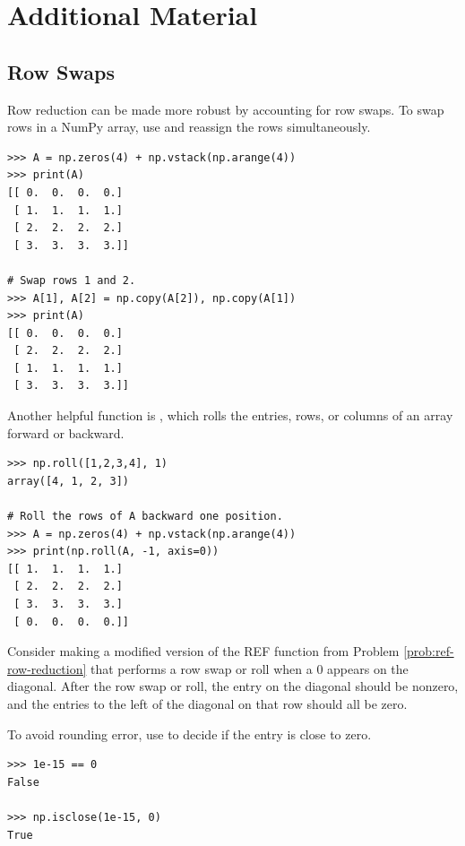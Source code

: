 \newpage

\section*{Additional Material} %

\subsection*{Row Swaps} %

Row reduction can be made more robust by accounting for row swaps.
To swap rows in a NumPy array, use  and reassign the rows simultaneously.

\begin{lstlisting}
>>> A = np.zeros(4) + np.vstack(np.arange(4))
>>> print(A)
[[ 0.  0.  0.  0.]
 [ 1.  1.  1.  1.]
 [ 2.  2.  2.  2.]
 [ 3.  3.  3.  3.]]

# Swap rows 1 and 2.
>>> A[1], A[2] = np.copy(A[2]), np.copy(A[1])
>>> print(A)
[[ 0.  0.  0.  0.]
 [ 2.  2.  2.  2.]
 [ 1.  1.  1.  1.]
 [ 3.  3.  3.  3.]]
\end{lstlisting}

Another helpful function is , which rolls the entries, rows, or columns of an array forward or backward.

\begin{lstlisting}
>>> np.roll([1,2,3,4], 1)
array([4, 1, 2, 3])

# Roll the rows of A backward one position.
>>> A = np.zeros(4) + np.vstack(np.arange(4))
>>> print(np.roll(A, -1, axis=0))
[[ 1.  1.  1.  1.]
 [ 2.  2.  2.  2.]
 [ 3.  3.  3.  3.]
 [ 0.  0.  0.  0.]]
\end{lstlisting}

Consider making a modified version of the REF function from Problem \ref{prob:ref-row-reduction} that performs a row swap or roll when a $0$ appears on the diagonal.
After the row swap or roll, the entry on the diagonal should be nonzero, and the entries to the left of the diagonal on that row should all be zero.

To avoid rounding error, use  to decide if the entry is close to zero.

\begin{lstlisting}
>>> 1e-15 == 0
False

>>> np.isclose(1e-15, 0)
True
\end{lstlisting}

